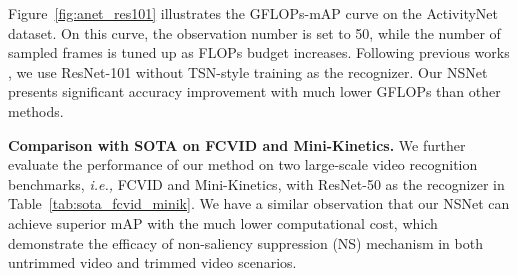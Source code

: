 \documentclass[runningheads]{llncs}
\newcommand{\figref}[1]{Figure~\ref{#1}}
\newcommand{\tabref}[1]{Table~\ref{#1}}
\begin{document}
\figref{fig:anet_res101} illustrates the GFLOPs-mAP curve on the ActivityNet dataset. On this curve, the observation number  is set to 50, while the number of sampled frames  is tuned up as FLOPs budget increases. 
Following previous works \cite{adaframe,liteeval,listentolook,marl}, we use ResNet-101 without TSN-style training as the recognizer.
Our NSNet presents significant accuracy improvement with much lower GFLOPs than other methods.  





\begin{table}[t]
\caption{Comparison with previous methods on FCVID and Mini-Kinetics. Our NSNet consistently outperforms state-of-the-art  in terms of accuracy and efficiency using ResNet-50 as the recognizer.}
\label{tab:sota_fcvid_minik}
\centering
\setlength{\tabcolsep}{8pt}
\end{table} \noindent\textbf{Comparison with SOTA on FCVID and Mini-Kinetics.}
We further evaluate the performance of our method on two large-scale video recognition benchmarks, \emph{i.e.,} FCVID and Mini-Kinetics, with ResNet-50 as the recognizer in \tabref{tab:sota_fcvid_minik}. We have a similar observation that our NSNet can achieve superior mAP with the much lower computational cost, which demonstrate the efficacy of non-saliency suppression (NS) mechanism in both untrimmed video and trimmed video scenarios.
\end{document}
